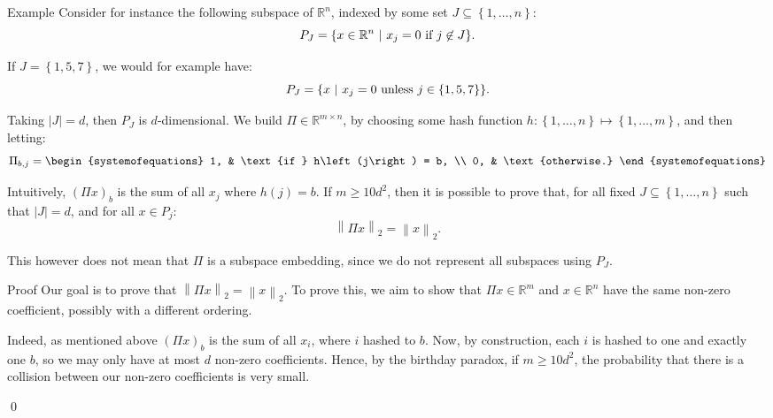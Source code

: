 \documentclass[a4paper]{article}
\begin{document}
\begin{parag}{Example}
    Consider for instance the following subspace of $\mathbb{R}^n$, indexed by some set $J \subseteq \left\{1, \ldots, n\right\}$: 
    \[P_J = \left\{x \in \mathbb{R}^n \suchthat x_j = 0 \text{ if } j \not\in J\right\}.\]
    
    If $J = \left\{1, 5, 7\right\}$, we would for example have: 
    \[P_J = \left\{x \suchthat x_j = 0 \text{ unless } j \in \left\{1, 5, 7\right\}\right\}.\]
    
    Taking $\left|J\right| = d$, then $P_J$ is $d$-dimensional. We build $\Pi \in \mathbb{R}^{m \times n}$, by choosing some hash function $h: \left\{1, \ldots, n\right\} \mapsto \left\{1, \ldots, m\right\}$, and then letting: 
    \[\Pi_{b,j} = \begin{systemofequations} 1, & \text{if } h\left(j\right) = b, \\ 0, & \text{otherwise.} \end{systemofequations}\]

    Intuitively, $\left(\Pi x\right)_b$ is the sum of all $x_j$ where $h\left(j\right) = b$. If $m \geq 10 d^2$, then it is possible to prove that, for all fixed $J \subseteq \left\{1, \ldots, n\right\}$ such that $\left|J\right| = d$, and for all $x \in P_j$: 
    \[\left\|\Pi x\right\|_2 = \left\|x\right\|_2.\]

    This however does not mean that $\Pi$ is a subspace embedding, since we do not represent all subspaces using $P_J$.

    \begin{subparag}{Proof}
        Our goal is to prove that $\left\|\Pi x\right\|_2 = \left\|x\right\|_2$. To prove this, we aim to show that $\Pi x \in \mathbb{R}^m$ and $x \in \mathbb{R}^n$ have the same non-zero coefficient, possibly with a different ordering.

        Indeed, as mentioned above $\left(\Pi x\right)_b$ is the sum of all $x_i$, where $i$ hashed to $b$. Now, by construction, each $i$ is hashed to one and exactly one $b$, so we may only have at most $d$ non-zero coefficients. Hence, by the birthday paradox, if $m \geq 10 d^2$, the probability that there is a collision between our non-zero coefficients is very small.

        \qed
    \end{subparag}
\end{parag}
\end{document}
